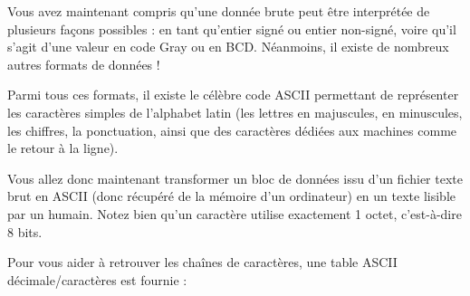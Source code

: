 \documentclass[11pt,a4paper]{article}
\begin{document}
\noindent Vous avez maintenant compris qu'une donnée brute peut être interprétée de plusieurs façons possibles : en tant qu'entier signé ou entier non-signé, voire qu'il s'agit d'une valeur en code Gray ou en BCD.
Néanmoins, il existe de nombreux autres formats de données !

\noindent Parmi tous ces formats, il existe le célèbre code ASCII permettant de représenter les caractères simples de l'alphabet latin (les lettres en majuscules, en minuscules, les chiffres, la ponctuation, ainsi que des caractères dédiées aux machines comme le retour à la ligne).

\medskip

\noindent Vous allez donc maintenant transformer un bloc de données issu d'un fichier texte brut en ASCII (donc récupéré de la mémoire d'un ordinateur) en un texte lisible par un humain.
Notez bien qu'un caractère utilise exactement 1 octet, c'est-à-dire 8 bits.

\bigskip

\noindent Pour vous aider à retrouver les chaînes de caractères, une table ASCII décimale/caractères est fournie :
\end{document}
